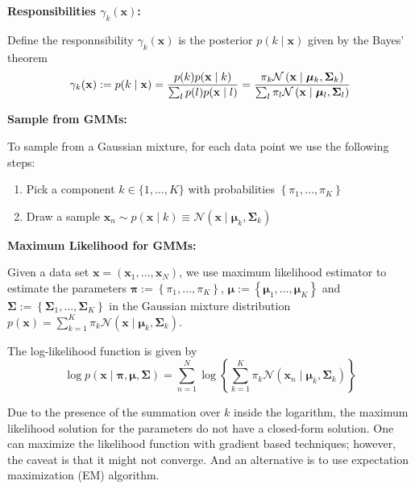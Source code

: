 \documentclass[11pt]{article}
\theoremstyle{plain} %
\newenvironment{topic}
{\color{C2}\normalfont\begin{framed}\begingroup }
  {\endgroup\end{framed}}
\theoremstyle{remark}
\begin{document}
\begin{topic}
\begin{itemize}
  \end{itemize}

  \textbf{Responsibilities $\gamma_{k}(\mathbf{x})$:}

  Define the responnsibility $\gamma_{k}(\mathbf{x})$ is the posterior $p(k \mid
    \mathbf{x})$ given by the Bayes' theorem
  $$
    \gamma_{k}(\mathbf{x}) := p(k \mid \mathbf{x}) =\frac{p(k) p(\mathbf{x} \mid k)}{\sum_{l} p(l) p(\mathbf{x} \mid l)}                                                                                                                                 \\
    =\frac{\pi_{k} \mathcal{N}\left(\mathbf{x} \mid \boldsymbol{\mu}_{k}, \mathbf{\Sigma}_{k}\right)}{\sum_{l} \pi_{l} \mathcal{N}\left(\mathbf{x} \mid \boldsymbol{\mu}_{l}, \mathbf{\Sigma}_{l}\right)}
  $$



  \textbf{Sample from GMMs:}

  To sample from a Gaussian mixture, for each data point we use the following
  steps:

  \begin{enumerate}
    \item Pick a component $k \in\{1, \ldots, K\}$ with probabilities
          $\left\{\pi_{1}, \ldots, \pi_{K}\right\}$

    \item Draw a sample $\mathbf{x}_{n} \sim p(\mathbf{x} \mid k) \equiv \mathcal{N}\left(\mathbf{x} \mid
            \boldsymbol{\mu}_{k}, \boldsymbol{\Sigma}_{k}\right)$
  \end{enumerate}

  \textbf{Maximum Likelihood for GMMs:}

  Given a data set $\mathbf{x}=\left(\mathbf{x}_{1}, \ldots,
    \mathbf{x}_{N}\right)$, we use maximum likelihood estimator to estimate the parameters
  $\boldsymbol{\pi}:=\left\{\pi_{1}, \ldots, \pi_{K}\right\}$, $\boldsymbol{\mu}
    :=\left\{\boldsymbol{\mu}_{1}, \ldots, \boldsymbol{\mu}_{K}\right\}$ and
  $\boldsymbol{\Sigma} :=\left\{\boldsymbol{\Sigma}_{1}, \ldots,
    \boldsymbol{\Sigma}_{K}\right\}$ in the Gaussian mixture distribution
  $p(\mathbf{x})=\sum_{k=1}^{K} \pi_{k} \mathcal{N}\left(\mathbf{x} \mid
    \boldsymbol{\mu}_{k}, \boldsymbol{\Sigma}_{k}\right)$.

  The log-likelihood function is given by
  $$
    \log p(\mathbf{x} \mid \boldsymbol{\pi}, \boldsymbol{\mu}, \boldsymbol{\Sigma})=\sum_{n=1}^{N} \log \left\{\sum_{k=1}^{K} \pi_{k} \mathcal{N}\left(\mathbf{x}_{n} \mid \boldsymbol{\mu}_{k}, \boldsymbol{\Sigma}_{k}\right)\right\}
  $$

  Due to the presence of the summation over $k$ inside the logarithm, the maximum
  likelihood solution for the parameters do not have a closed-form solution.
  One can maximize the likelihood function with gradient based techniques; however, the caveat is
  that it might not converge. And an alternative is to
  use expectation maximization (EM) algorithm.
\end{topic}
\end{document}
